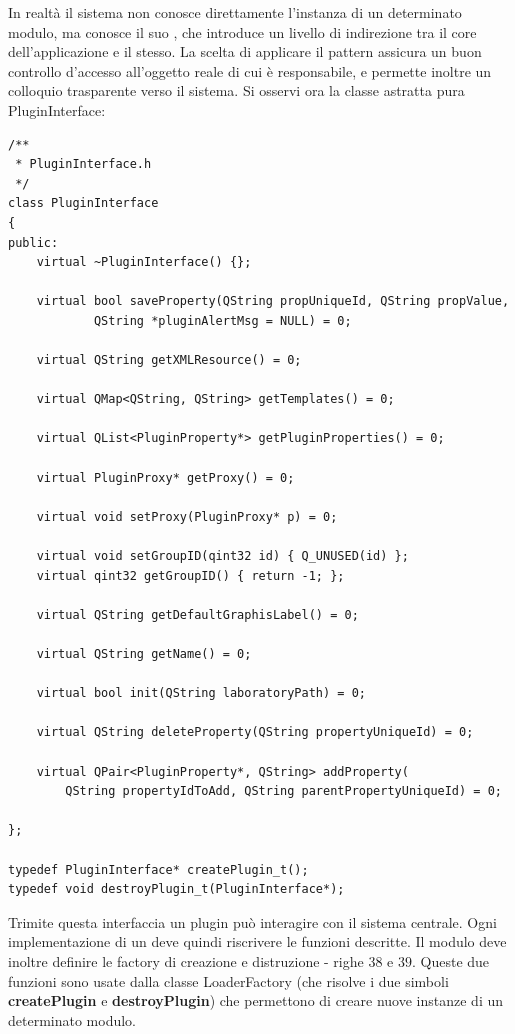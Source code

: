 In realtà il sistema non conosce direttamente l'instanza di un determinato modulo, ma conosce il suo \proxy{}, che introduce un livello di indirezione tra il core dell'applicazione e il \plugin{} stesso. La scelta di applicare il pattern \proxy{}\cite{SSA06} assicura un buon controllo d'accesso all'oggetto reale di cui è responsabile, e permette inoltre un colloquio trasparente verso il sistema. Si osservi ora la classe astratta pura PluginInterface:
\begin{lstlisting}
/**
 * PluginInterface.h
 */
class PluginInterface
{
public:
	virtual ~PluginInterface() {};

	virtual bool saveProperty(QString propUniqueId, QString propValue,
			QString *pluginAlertMsg = NULL) = 0;

	virtual QString getXMLResource() = 0;

	virtual QMap<QString, QString> getTemplates() = 0;
	
	virtual QList<PluginProperty*> getPluginProperties() = 0;

	virtual PluginProxy* getProxy() = 0;

	virtual void setProxy(PluginProxy* p) = 0;

	virtual void setGroupID(qint32 id) { Q_UNUSED(id) };
	virtual qint32 getGroupID() { return -1; };

	virtual QString getDefaultGraphisLabel() = 0;

	virtual QString getName() = 0;

	virtual bool init(QString laboratoryPath) = 0;
	
	virtual QString deleteProperty(QString propertyUniqueId) = 0;
	
	virtual QPair<PluginProperty*, QString> addProperty(
		QString propertyIdToAdd, QString parentPropertyUniqueId) = 0;
	
};

typedef PluginInterface* createPlugin_t();
typedef void destroyPlugin_t(PluginInterface*);
\end{lstlisting}

Trimite questa interfaccia un plugin può interagire con il sistema centrale. Ogni implementazione di un \plugin{} deve quindi riscrivere le funzioni descritte. Il modulo deve inoltre definire le factory di creazione e distruzione - righe $38$ e $39$. Queste due funzioni sono usate dalla classe LoaderFactory (che risolve i due simboli \textbf{createPlugin} e \textbf{destroyPlugin}) che permettono di creare nuove instanze di un determinato modulo.


